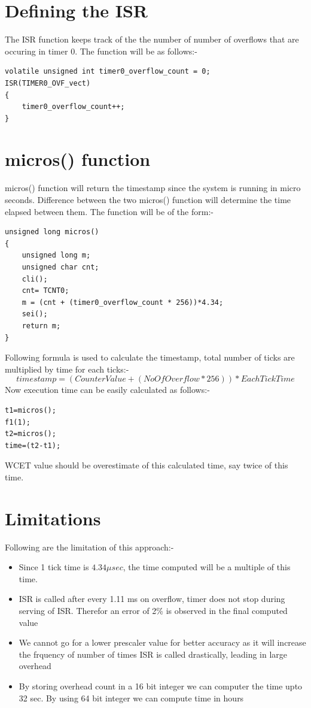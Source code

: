 \documentclass[16pt]{report}
\begin{document}
\section{Defining the ISR}
The ISR function keeps track of the the number of number of overflows that are occuring in timer 0. The function will be as follows:-
\begin{verbatim}
volatile unsigned int timer0_overflow_count = 0; 
ISR(TIMER0_OVF_vect)
{
    timer0_overflow_count++;
}
\end{verbatim}

\section{micros() function}
micros() function will return the timestamp since the system is running in micro seconds. Difference between the two micros() function will determine the time elapsed between them. The function will be of the form:-
\begin{verbatim}
unsigned long micros()
{
    unsigned long m;
    unsigned char cnt;
    cli();
    cnt= TCNT0;
    m = (cnt + (timer0_overflow_count * 256))*4.34;
    sei();
    return m;
}
\end{verbatim}

Following formula is used to calculate the timestamp, total number of ticks are multiplied by time for each ticks:-
\begin{equation}
    timestamp = ( CounterValue + (NoOfOverflow * 256)) * EachTickTime
\end{equation}
Now execution time can be easily calculated as follows:-
\begin{verbatim}
t1=micros();
f1(1);
t2=micros();
time=(t2-t1);
\end{verbatim}
WCET value should be overestimate of this calculated time, say twice of this time.


\section{Limitations}
Following are the limitation of this approach:-
\begin{itemize}
    \item Since 1 tick time is $4.34 \mu sec$, the time computed will be a multiple of this time.
    \item ISR is called after every 1.11 ms on overflow, timer does not stop during serving of ISR. Therefor an error of 2\% is observed in the final computed value
    \item We cannot go for a lower prescaler value for better accuracy as it will increase the frquency of number of times ISR is called drastically, leading in large overhead
    \item By storing overhead count in a 16 bit integer we can computer the time upto 32 sec. By using 64 bit integer we can compute time in hours
\end{itemize}
\end{document}
